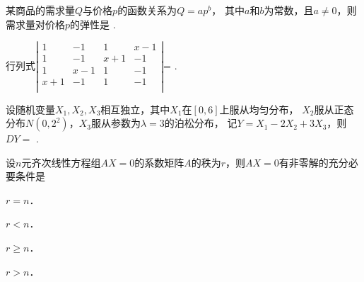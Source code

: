\documentclass[plain,noanswer,medmath]{../../template/jnuexam}
\begin{document}








\begin{problem}
某商品的需求量$Q$与价格$p$的函数关系为$Q=ap^b$，
其中$a$和$b$为常数，且$a\ne 0$，则需求量对价格$p$的弹性是 \fillin{}.
\end{problem}


\begin{problem}
行列式$\left| \begin{matrix}
   1 &  -1 &   1 & x-1 \\
   1 &  -1 & x+1 &  -1 \\
   1 & x-1 &   1 &  -1 \\
 x+1 &  -1 &   1 &  -1 \\
\end{matrix} \right|$= \fillin{}.
\end{problem}


\begin{problem}
设随机变量$X_1,X_2,X_3$相互独立，其中$X_1$在$[0,6]$上服从均匀分布，
$X_2$服从正态分布$N(0,2^2)$，$X_3$服从参数为$\lambda =3$的泊松分布，
记$Y=X_1-2X_2+3X_3$，则$DY=$ \fillin{}.
\end{problem}












\begin{problem}
设$n$元齐次线性方程组$AX=0$的系数矩阵$A$的秩为$r$，则$AX=0$有非零解的充分必要条件是 \pickout{}
\begin{abcd}
\item $r=n$．
\item $r<n$．
\item $r\ge n$．
\item $r>n$．
\end{abcd}
\end{problem}




\end{document}
